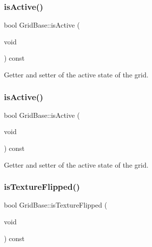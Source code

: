 \subsubsection{\texorpdfstring{is\+Active()}{isActive()}\hspace{0.1cm}{\footnotesize\ttfamily [1/2]}}
{\footnotesize\ttfamily bool Grid\+Base\+::is\+Active (\begin{DoxyParamCaption}\item[{void}]{ }\end{DoxyParamCaption}) const\hspace{0.3cm}{\ttfamily [inline]}}

Getter and setter of the active state of the grid. \mbox{\label{classGridBase_a700fb3a795e9d60384e59944db015159}} 
\subsubsection{\texorpdfstring{is\+Active()}{isActive()}\hspace{0.1cm}{\footnotesize\ttfamily [2/2]}}
{\footnotesize\ttfamily bool Grid\+Base\+::is\+Active (\begin{DoxyParamCaption}\item[{void}]{ }\end{DoxyParamCaption}) const\hspace{0.3cm}{\ttfamily [inline]}}

Getter and setter of the active state of the grid. \mbox{\label{classGridBase_a6d6532670cbc9ef71abc19c4e2a69ffc}} 
\subsubsection{\texorpdfstring{is\+Texture\+Flipped()}{isTextureFlipped()}\hspace{0.1cm}{\footnotesize\ttfamily [1/2]}}
{\footnotesize\ttfamily bool Grid\+Base\+::is\+Texture\+Flipped (\begin{DoxyParamCaption}\item[{void}]{ }\end{DoxyParamCaption}) const\hspace{0.3cm}{\ttfamily [inline]}}

